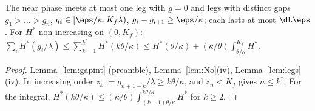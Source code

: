 \begin{lemma}\label{lem:Nsum}
The near phase meets at most one leg with $g=0$ and legs with distinct gaps $g_1>\dots>g_n$, $g_i\in[\eps/\kappa,K_f\lambda)$,
$g_i-g_{i+1}\ge\eps/\kappa$; each lasts at most $\dL\eps$. For $H^*$ non-increasing on $(0,K_f)$:
$\sum_iH^*(g_i/\lambda)\le\sum_{k=1}^{k^*}H^*(k\theta/\kappa)\le H^*(\theta/\kappa)+(\kappa/\theta)\int_{\theta/\kappa}^{K_f}H^*$.
\end{lemma}
\begin{proof}
Lemma~\ref{lem:gapint} (preamble), Lemma~\ref{lem:No}(iv), Lemma~\ref{lem:legs}(iv). In increasing order $z_k:=g_{n+1-k}/\lambda\ge
k\theta/\kappa$, and $z_n<K_f$ gives $n\le k^*$. For the integral, $H^*(k\theta/\kappa)\le(\kappa/\theta)
\int_{(k-1)\theta/\kappa}^{k\theta/\kappa}H^*$ for $k\ge2$.
\end{proof}

